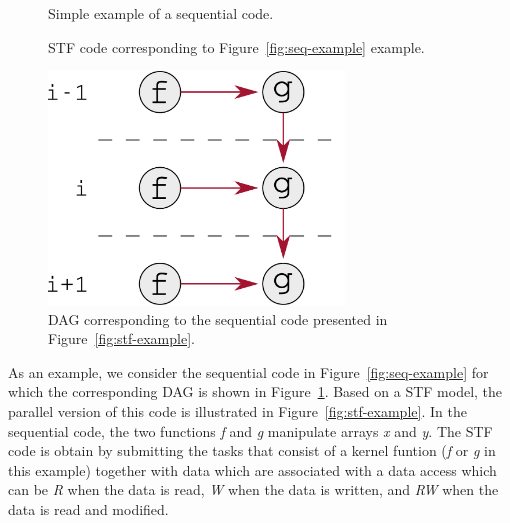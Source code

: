 \documentclass{article}
\begin{document}
\begin{figure}[!h]
  \begin{minipage}{0.5\textwidth}
    \centering {}
    
    \caption{\label{fig:seq-example}Simple example of a sequential code.}
    \vspace{0.5cm}
    \centering 
    \caption{\label{fig:stf-example}STF code corresponding to Figure~\ref{fig:seq-example} example.}
  \end{minipage}
  \hspace{0.5cm}
  \begin{minipage}{0.5\textwidth}
    \centering
    \includegraphics[width=0.7\textwidth]{figures/example_dag}
    \caption{\label{fig:dag-example}DAG corresponding to the
      sequential code presented in Figure~\ref{fig:stf-example}.}
  \end{minipage}
\end{figure}

As an example, we consider the sequential code in
Figure~\ref{fig:seq-example} for which the corresponding DAG is
shown in Figure~\ref{fig:dag-example}. Based on a STF model, the
parallel version of this code is illustrated in
Figure~\ref{fig:stf-example}. In the sequential code, the two
functions \textit{f} and \textit{g} manipulate arrays \textit{x} and
\textit{y}. The STF code is obtain by submitting the tasks that
consist of a kernel funtion (\textit{f} or \textit{g} in this
example) together with data which are associated with a data access
which can be \textit{R} when the data is read, \textit{W} when the
data is written, and \textit{RW} when the data is read and modified.
\end{document}
